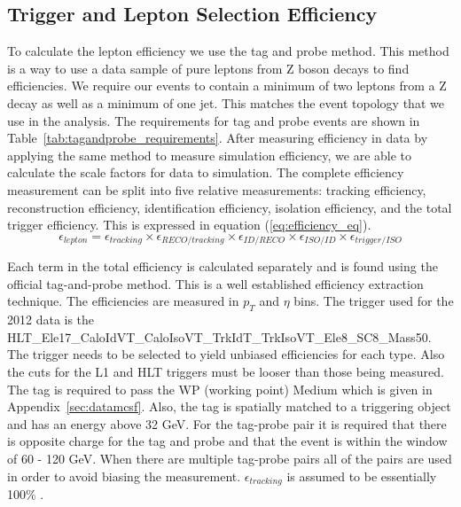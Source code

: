 \subsection{Trigger and Lepton Selection Efficiency}

To calculate the lepton efficiency we use the tag and probe method. This method is a way to use a data sample of pure leptons from Z boson decays to find efficiencies.  We require our events to contain a minimum of two leptons from a Z decay as well as a minimum of one jet.  This matches the event topology that we use in the analysis. The requirements for tag and probe events are shown in Table~\ref{tab:tagandprobe_requirements}. After measuring efficiency in data by applying the same method to measure simulation efficiency, we are able to calculate the scale factors for data to simulation. The complete efficiency measurement can be split into five relative measurements: tracking efficiency, reconstruction efficiency, identification efficiency, isolation efficiency, and the total trigger efficiency.  This is expressed in equation (\ref{eq:efficiency_eq}).
\begin{equation}
\epsilon_{lepton} = \epsilon_{tracking} \times \epsilon_{RECO/tracking} \times \epsilon_{ID/RECO} \times \epsilon_{ISO/ID} \times \epsilon_{trigger/ISO}
\label{eq:efficiency_eq}
\end{equation}

Each term in the total efficiency is calculated separately and is found using the official tag-and-probe method. This is a well established efficiency extraction technique. The efficiencies are measured in $p_T$ and $\eta$ bins. The trigger used for the 2012 data is the HLT\_Ele17\_CaloIdVT\_CaloIsoVT\_TrkIdT\_TrkIsoVT\_Ele8\_SC8\_Mass50. The trigger needs to be selected to yield unbiased efficiencies for each type. Also the cuts for the L1 and HLT triggers must be looser than those being measured. The tag is required to pass the WP (working point) Medium which is given in Appendix~\ref{sec:datamcsf}. Also, the tag is spatially matched to a triggering object and has an energy above 32 GeV. For the tag-probe pair it is required that there is opposite charge for the tag and probe and that the event is within the window of 60 - 120 GeV. When there are multiple tag-probe pairs all of the pairs are used in order to avoid biasing the measurement. $\epsilon_{tracking}$ is assumed to be essentially 100\% \cite{WandZCrossSections}.

